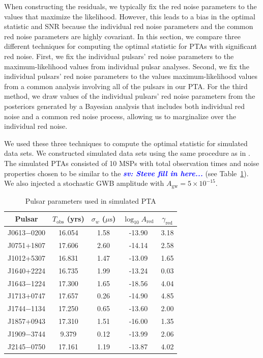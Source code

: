 \documentclass[twocolumn,aps,prd,superscriptaddress]{revtex4-1}
\newcommand{\sv}[1]{\textcolor{blue}{\it{\textbf{sv: #1}}} }
\newcommand{\Agw}{\ensuremath{A_\mathrm{gw}}}
\begin{document}
When constructing the residuals, 
we typically fix the red noise parameters to the values that 
maximize the likelihood. 
However, this leads to a bias in the optimal statistic and SNR because 
the individual red noise parameters and the common red noise parameters 
are highly covariant. 
In this section, we compare three different techniques for computing the 
optimal statistic for PTAs with significant red noise. 
First, we fix the individual pulsars' red noise parameters to the 
maximum-likelihood values from individual pulsar analyses. 
Second, we fix the individual pulsars' red noise parameters to the 
values maximum-likelihood values from a common analysis 
involving all of the pulsars in our PTA. 
For the third method, we draw values of the individual pulsars' 
red noise parameters from the posteriors generated by a Bayesian analysis 
that includes both individual red noise and a common red noise process, 
allowing us to marginalize over the individual red noise.

We used these three techniques to compute the optimal statistic for simulated data sets. 
We constructed simulated data sets using the same procedure as in \citet{tlb+2017}. 
The simulated PTAs consisted of 10 MSPs with 
total observation times and noise properties chosen to be 
similar to the \sv{Steve fill in here...} (see Table~\ref{tab:sim}). 
We also injected a stochastic GWB amplitude with $\Agw = 5\times10^{-15}$.
\begin{table}[htb]
	\setlength{\tabcolsep}{5pt}
	\caption{Pulsar parameters used in simulated PTA}
	\begin{center}
	\begin{tabular}{ccccc}
		\hline\hline
    		Pulsar	& $T_\mathrm{obs}$ (yrs) & $\sigma_w$ ($\mu\mathrm{s}$) & $\log_{10}A_\mathrm{red}$ & $\gamma_\mathrm{red}$ \\
		\hline
		J0613$-$0200 & 16.054 & 1.58 & -13.90 & 3.18 \\
		J0751+1807 & 17.606 & 2.60 & -14.14 & 2.58 \\
		J1012+5307 & 16.831 & 1.47 & -13.09 & 1.65 \\
		J1640+2224 & 16.735 & 1.99 & -13.24 & 0.03 \\
		J1643$-$1224 & 17.300 & 1.65 & -18.56 & 4.04 \\
		J1713+0747 & 17.657 & 0.26 & -14.90 & 4.85 \\
		J1744$-$1134 & 17.250 & 0.65 & -13.60 & 2.00 \\
		J1857+0943 & 17.310 & 1.51 & -16.00 & 1.35 \\
		J1909$-$3744 & 9.379 & 0.12 & -13.99 & 2.06 \\
		J2145$-$0750 & 17.161 & 1.19 & -13.87 & 4.02 \\
    		\hline\hline
	\end{tabular}
	\end{center}
	\label{tab:sim}
\end{table}
\end{document}
